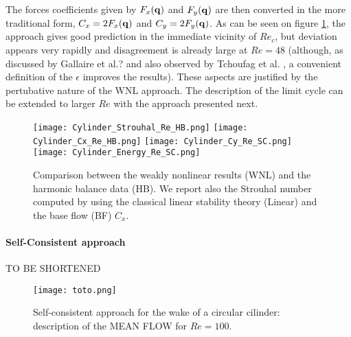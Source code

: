 \documentclass[twocolumn,10pt]{asme2ej}
\begin{document}
{\color{red} 
The forces coefficients given by $F_x({\bf q})$ and $F_y({\bf q})$ are then converted in the more traditional form, $C_x=2F_x({\bf q})$ and $C_y=2F_y({\bf q})$.
}
As can be seen on figure \ref{fig:Comp2},  the approach gives good prediction in the immediate vicinity of $Re_c$, but deviation appears very rapidly and disagreement is already large at $Re=48$ (although, as discussed by Gallaire et al.? and also observed by Tchoufag et al. \cite{Tchoufag2015}, a convenient definition of the $\epsilon$ improves the results). {\color{red} These aspects are justified by the pertubative nature of the WNL approach. The description of the limit cycle can be extended to larger $Re$ with the approach presented next.  }

\begin{figure}
\begin{center}
\texttt{[image: Cylinder\_Strouhal\_Re\_HB.png]}
\texttt{[image: Cylinder\_Cx\_Re\_HB.png]}
\texttt{[image: Cylinder\_Cy\_Re\_SC.png]}
\texttt{[image: Cylinder\_Energy\_Re\_SC.png]}
\end{center}
\caption{Comparison between the weakly nonlinear results (WNL) and the harmonic 
balance data (HB). We report also the Strouhal number computed by using the 
classical linear stability theory (Linear) and the base flow (BF) $C_x$.
}
\label{fig:Comp2}
\end{figure}


\paragraph{Self-Consistent approach}

TO BE SHORTENED


\begin{figure}
\begin{center}
\texttt{[image: toto.png]}
\end{center}
\caption{Self-consistent approach for the wake of a circular cilinder:  description of the MEAN FLOW for  $Re = 
100$.}
\label{fig:MF60}
\end{figure}
\end{document}
